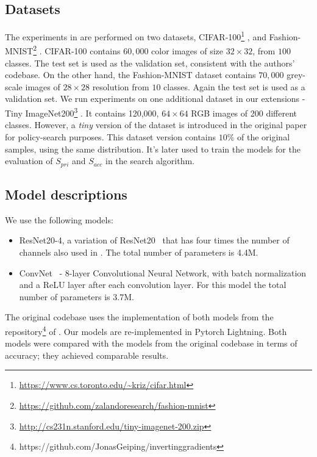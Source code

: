 \subsection{Datasets}

The experiments in \cite{gao2021privacy} are performed on two datasets, CIFAR-100\footnote{\url{https://www.cs.toronto.edu/~kriz/cifar.html}} \cite{krizhevsky2009learning}, and Fashion-MNIST\footnote{\url{https://github.com/zalandoresearch/fashion-mnist}} \cite{xiao2017fashionmnist}. CIFAR-100 contains $60,000$ color images of size $32\times32$, from $100$ classes. The test set is used as the validation set, consistent with the authors' codebase.
On the other hand, the Fashion-MNIST dataset contains $70,000$  grey-scale images of $28\times28$ resolution from $10$ classes. Again the test set is used as a validation set. We run experiments on one additional dataset in our extensions - Tiny ImageNet200\footnote{\url{http://cs231n.stanford.edu/tiny-imagenet-200.zip}} \cite{imagenet_cvpr09}. It contains 120,000, $64\times64$ RGB images of 200 different classes. However, a \emph{tiny} version of the dataset is introduced in the original paper for policy-search purposes. This dataset version contains $10\%$ of the original samples, using the same distribution. It's later used to train the models for the evaluation of $S_{pri}$ and $S_{acc}$ in the search algorithm.

\subsection{Model descriptions}
We use the following models:
\begin{itemize}[noitemsep,topsep=-3pt]
    \itemsep0em 
    \item ResNet20-4, a variation of ResNet20~\cite{he2016deep} that has four times the number of channels also used in \cite{geiping2020inverting}. The total number of parameters is 4.4M.
    \item ConvNet~\cite{geiping2020inverting} - 8-layer Convolutional Neural Network, with batch normalization and a ReLU layer after each convolution layer. For this model the total number of parameters is 3.7M.
\end{itemize}
The original codebase uses the implementation of both models from the repository\footnote{https://github.com/JonasGeiping/invertinggradients} of \cite{geiping2020inverting}. Our models are re-implemented in Pytorch Lightning. Both models were compared with the models from the original codebase in terms of accuracy; they achieved comparable results.

